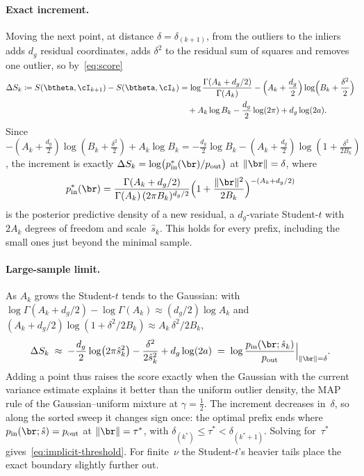\documentclass{article}
\newcommand{\pin}{p_{\mathrm{in}}}
\newcommand{\pout}{p_{\mathrm{out}}}
\newcommand{\gaussunif}{Gaussian--uniform\xspace}
\begin{document}
\paragraph{Exact increment.}
Moving the next point, at distance $\delta = \delta_{(k+1)}$, from
the outliers to the inliers adds $d_g$ residual coordinates, adds
$\delta^2$ to the residual sum of squares and removes one outlier,
so by~\eqref{eq:score}
\begin{equation}
	\begin{aligned}
		\Delta S_k \coloneqq S(\btheta, \cI_{k+1}) - S(\btheta, \cI_k)
		 & = \log\frac{\Gamma(A_k + d_g/2)}{\Gamma(A_k)}
		- \Bigl(A_k + \frac{d_g}{2}\Bigr)\log\Bigl(B_k + \frac{\delta^2}{2}\Bigr) \\
		 & \quad + A_k \log B_k - \frac{d_g}{2}\log(2\pi) + d_g \log(2a).
	\end{aligned}
	\label{eq:delta-S}
\end{equation}
Since $-(A_k + \tfrac{d_g}{2})\log(B_k + \tfrac{\delta^2}{2}) + A_k\log B_k
= -\tfrac{d_g}{2}\log B_k - (A_k + \tfrac{d_g}{2})\log(1 + \tfrac{\delta^2}{2B_k})$,
the increment is exactly $\Delta S_k = \log\bigl(\pin^*(\br)/\pout\bigr)$
at $\|\br\| = \delta$, where
\begin{equation*}
	\pin^*(\br) = \frac{\Gamma(A_k + d_g/2)}{\Gamma(A_k)\,(2\pi B_k)^{d_g/2}}
	\Bigl(1 + \frac{\|\br\|^2}{2B_k}\Bigr)^{-(A_k + d_g/2)}
\end{equation*}
is the posterior predictive density of a new residual, a $d_g$-variate Student-$t$ with
$2A_k$ degrees of freedom and scale~$\hat s_k$.  This holds for every
prefix, including the small ones just beyond the minimal sample.

\paragraph{Large-sample limit.}
As $A_k$ grows the Student-$t$ tends to the Gaussian: with
$\log\Gamma(A_k + d_g/2) - \log\Gamma(A_k) \approx (d_g/2)\log A_k$
and $(A_k + d_g/2)\log(1 + \delta^2/2B_k) \approx A_k\,\delta^2/2B_k$,
\begin{equation*}
	\Delta S_k \;\approx\;
	-\frac{d_g}{2}\log\bigl(2\pi\hat s_k^2\bigr)
	- \frac{\delta^2}{2\hat s_k^2}
	+ d_g\log(2a)
	\;=\;
	\log\frac{\pin(\br;\hat s_k)}{\pout}\Big|_{\|\br\| = \delta}.
\end{equation*}
Adding a point thus raises the score exactly when the Gaussian with
the current variance estimate explains it better than the uniform
outlier density, the MAP rule of the \gaussunif mixture at
$\gamma = \tfrac12$.  The increment decreases in~$\delta$, so along
the sorted sweep it changes sign once: the optimal prefix ends where
$\pin(\br;\hat s) = \pout$ at $\|\br\| = \tau^*$, with
$\delta_{(k^*)} \le \tau^* < \delta_{(k^*+1)}$.  Solving for~$\tau^*$
gives~\eqref{eq:implicit-threshold}.  For finite~$\nu$ the
Student-$t$'s heavier tails place the exact boundary slightly further
out.
\end{document}
